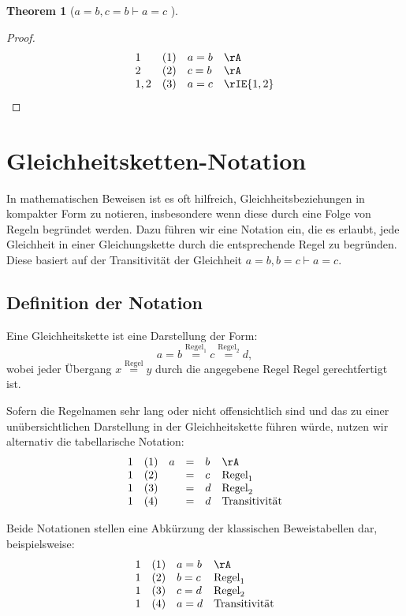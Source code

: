 \documentclass{book}
\theoremstyle{plain}
\newtheorem{theorem}{Theorem}
\theoremstyle{remark}
\theoremstyle{definition}
\begin{document}
\label{aIdbwcIdbImpaIdc}
\begin{theorem}[\(a=b,c=b\vdash a=c\) ]
\end{theorem}
\begin{proof}
	\[
	\begin{array}{llll}
		1 & (1) & a=b & \rA \\
		2 & (2) & c=b & \rA \\
		1,2 & (3) & a=c & \rIE{1,2} \\
	\end{array}
	\]
\end{proof}



\section{Gleichheitsketten-Notation}
\label{Gleichheitsketten-Notation}
In mathematischen Beweisen ist es oft hilfreich, Gleichheitsbeziehungen in kompakter Form zu notieren, insbesondere wenn diese durch eine Folge von Regeln begründet werden. Dazu führen wir eine Notation ein, die es erlaubt, jede Gleichheit in einer Gleichungskette durch die entsprechende Regel zu begründen. Diese basiert auf der Transitivität der Gleichheit \(a=b, b=c \vdash a=c\).

\subsection*{Definition der Notation}

Eine Gleichheitskette ist eine Darstellung der Form:
\[
a = b \stackrel{\text{Regel}_1}{=} c \stackrel{\text{Regel}_2}{=} d,
\]
wobei jeder Übergang \(x \stackrel{\text{Regel}}{=} y\) durch die angegebene Regel \(\text{Regel}\) gerechtfertigt ist. 

Sofern die Regelnamen sehr lang oder nicht offensichtlich sind und das zu einer unübersichtlichen Darstellung in der Gleichheitskette führen würde, nutzen wir alternativ die tabellarische Notation:
\[
\begin{array}{llclll}
	1 & (1) & a & = & b & \rA \\
	1 & (2) &   & = & c & \text{Regel}_1 \\
	1 & (3) &   & = & d & \text{Regel}_2 \\
        1 & (4) &   & = & d & \text{Transitivität} \\
\end{array}
\]

Beide Notationen stellen eine Abkürzung der klassischen Beweistabellen dar, beispielsweise:
\[
\begin{array}{llll}
	1 & (1) & a=b & \rA \\
	1 & (2) & b=c & \text{Regel}_1 \\
	1 & (3) & c=d & \text{Regel}_2 \\
	1 & (4) & a=d & \text{Transitivität} \\
\end{array}
\]
\end{document}
